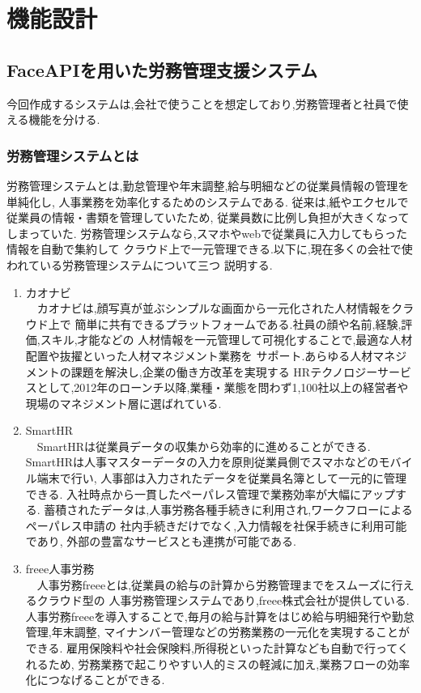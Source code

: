 \chapter{機能設計}
\label{chp:chart}

\section{FaceAPIを用いた労務管理支援システム}
\label{sec:chart_figure}
今回作成するシステムは,会社で使うことを想定しており,労務管理者と社員で使える機能を分ける.

\subsection{労務管理システムとは}
労務管理システムとは,勤怠管理や年末調整,給与明細などの従業員情報の管理を単純化し,
人事業務を効率化するためのシステムである.
従来は,紙やエクセルで従業員の情報・書類を管理していたため,
従業員数に比例し負担が大きくなってしまっていた.
労務管理システムなら,スマホやwebで従業員に入力してもらった情報を自動で集約して
クラウド上で一元管理できる.以下に,現在多くの会社で使われている労務管理システムについて三つ
説明する.

\renewcommand{\labelenumi}{(\arabic{enumi})}

\begin{enumerate}
  \item カオナビ \\
  　カオナビは,顔写真が並ぶシンプルな画面から一元化された人材情報をクラウド上で
  簡単に共有できるプラットフォームである.社員の顔や名前,経験,評価,スキル,才能などの
  人材情報を一元管理して可視化することで,最適な人材配置や抜擢といった人材マネジメント業務を
  サポート.あらゆる人材マネジメントの課題を解決し,企業の働き方改革を実現する
  HRテクノロジーサービスとして,2012年のローンチ以降,業種・業態を問わず1,100社以上の経営者や
  現場のマネジメント層に選ばれている. \\

  \item SmartHR\\
  　SmartHRは従業員データの収集から効率的に進めることができる.
  SmartHRは人事マスターデータの入力を原則従業員側でスマホなどのモバイル端末で行い,
  人事部は入力されたデータを従業員名簿として一元的に管理できる.
  入社時点から一貫したペーパレス管理で業務効率が大幅にアップする.
  蓄積されたデータは,人事労務各種手続きに利用され,ワークフローによるペーパレス申請の
  社内手続きだけでなく,入力情報を社保手続きに利用可能であり,
  外部の豊富なサービスとも連携が可能である. \\

  \item freee人事労務\\
  　人事労務freeeとは,従業員の給与の計算から労務管理までをスムーズに行えるクラウド型の
  人事労務管理システムであり,freee株式会社が提供している.
人事労務freeeを導入することで,毎月の給与計算をはじめ給与明細発行や勤怠管理,年末調整,
マイナンバー管理などの労務業務の一元化を実現することができる.
雇用保険料や社会保険料,所得税といった計算なども自動で行ってくれるため,
労務業務で起こりやすい人的ミスの軽減に加え,業務フローの効率化につなげることができる.
\end{enumerate}

